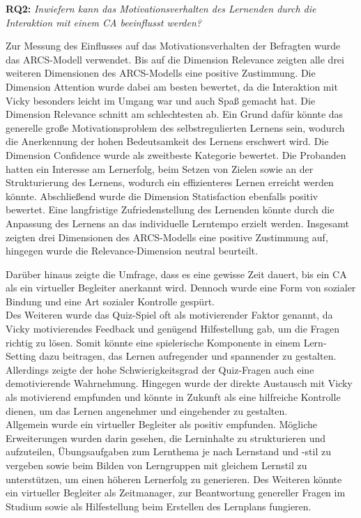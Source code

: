 \textbf{RQ2:} \textit{\glqq Inwiefern kann das Motivationsverhalten des Lernenden durch die Interaktion mit einem CA beeinflusst werden?\grqq{}}

Zur Messung des Einflusses auf das Motivationsverhalten der Befragten wurde das ARCS-Modell verwendet.
Bis auf die Dimension Relevance zeigten alle drei weiteren Dimensionen des ARCS-Modells eine positive Zustimmung.
Die Dimension Attention wurde dabei am besten bewertet, da die Interaktion mit Vicky besonders leicht im Umgang war und auch
Spaß gemacht hat. Die Dimension Relevance schnitt am schlechtesten ab. Ein Grund dafür könnte das generelle große
Motivationsproblem des selbstregulierten Lernens sein, wodurch die Anerkennung der hohen Bedeutsamkeit des Lernens erschwert wird.
Die Dimension Confidence wurde als zweitbeste Kategorie bewertet. Die Probanden hatten ein Interesse am Lernerfolg, beim Setzen 
von Zielen sowie an der Strukturierung des Lernens, wodurch ein effizienteres Lernen erreicht werden könnte. Abschließend wurde 
die Dimension Statisfaction ebenfalls positiv bewertet. Eine langfristige Zufriedenstellung des Lernenden könnte durch die Anpassung des Lernens
an das individuelle Lerntempo erzielt werden. Insgesamt zeigten drei Dimensionen des ARCS-Modells eine positive Zustimmung auf,
hingegen wurde die Relevance-Dimension neutral beurteilt.

Darüber hinaus zeigte die Umfrage, dass es eine gewisse Zeit dauert, bis ein CA als ein virtueller Begleiter anerkannt wird.
Dennoch wurde eine Form von sozialer Bindung und eine Art sozialer Kontrolle gespürt.\\
Des Weiteren wurde das Quiz-Spiel oft als motivierender Faktor genannt, da Vicky motivierendes Feedback und genügend Hilfestellung gab,
um die Fragen richtig zu lösen. Somit könnte eine spielerische Komponente in einem Lern-Setting dazu beitragen, das Lernen aufregender und 
spannender zu gestalten. Allerdings zeigte der hohe Schwierigkeitsgrad der Quiz-Fragen auch eine demotivierende Wahrnehmung. Hingegen wurde 
der direkte Austausch mit Vicky als motivierend empfunden und könnte in Zukunft als eine hilfreiche Kontrolle dienen, um das Lernen 
angenehmer und eingehender zu gestalten.\\
Allgemein wurde ein virtueller Begleiter als positiv empfunden. Mögliche Erweiterungen wurden darin gesehen, die Lerninhalte 
zu strukturieren und aufzuteilen, Übungsaufgaben zum Lernthema je nach Lernstand und -stil zu vergeben sowie beim Bilden 
von Lerngruppen mit gleichem Lernstil zu unterstützen, um einen höheren Lernerfolg zu generieren. Des Weiteren könnte ein virtueller Begleiter
als Zeitmanager, zur Beantwortung genereller Fragen im Studium sowie als Hilfestellung beim Erstellen des Lernplans fungieren.

